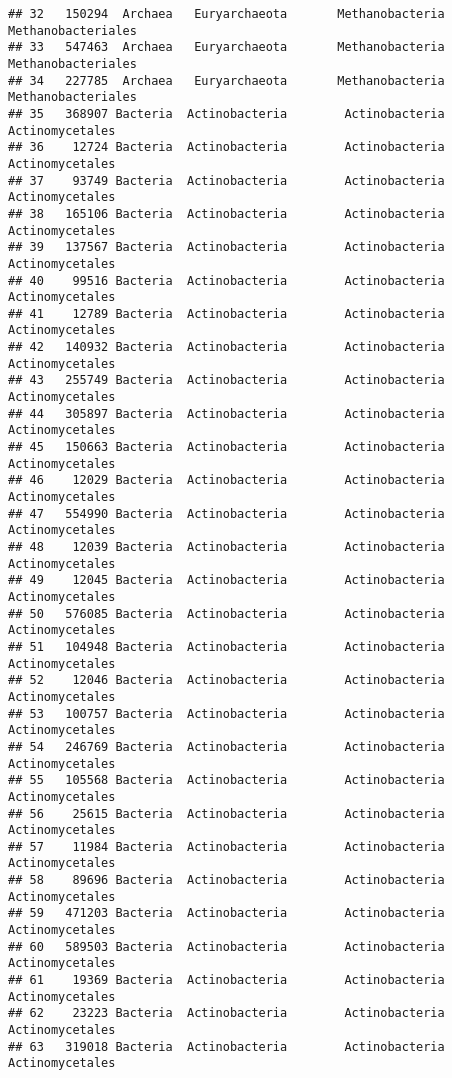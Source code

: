 \documentclass[
]{article}
\begin{document}
\begin{verbatim}
## 32   150294  Archaea   Euryarchaeota       Methanobacteria  Methanobacteriales
## 33   547463  Archaea   Euryarchaeota       Methanobacteria  Methanobacteriales
## 34   227785  Archaea   Euryarchaeota       Methanobacteria  Methanobacteriales
## 35   368907 Bacteria  Actinobacteria        Actinobacteria     Actinomycetales
## 36    12724 Bacteria  Actinobacteria        Actinobacteria     Actinomycetales
## 37    93749 Bacteria  Actinobacteria        Actinobacteria     Actinomycetales
## 38   165106 Bacteria  Actinobacteria        Actinobacteria     Actinomycetales
## 39   137567 Bacteria  Actinobacteria        Actinobacteria     Actinomycetales
## 40    99516 Bacteria  Actinobacteria        Actinobacteria     Actinomycetales
## 41    12789 Bacteria  Actinobacteria        Actinobacteria     Actinomycetales
## 42   140932 Bacteria  Actinobacteria        Actinobacteria     Actinomycetales
## 43   255749 Bacteria  Actinobacteria        Actinobacteria     Actinomycetales
## 44   305897 Bacteria  Actinobacteria        Actinobacteria     Actinomycetales
## 45   150663 Bacteria  Actinobacteria        Actinobacteria     Actinomycetales
## 46    12029 Bacteria  Actinobacteria        Actinobacteria     Actinomycetales
## 47   554990 Bacteria  Actinobacteria        Actinobacteria     Actinomycetales
## 48    12039 Bacteria  Actinobacteria        Actinobacteria     Actinomycetales
## 49    12045 Bacteria  Actinobacteria        Actinobacteria     Actinomycetales
## 50   576085 Bacteria  Actinobacteria        Actinobacteria     Actinomycetales
## 51   104948 Bacteria  Actinobacteria        Actinobacteria     Actinomycetales
## 52    12046 Bacteria  Actinobacteria        Actinobacteria     Actinomycetales
## 53   100757 Bacteria  Actinobacteria        Actinobacteria     Actinomycetales
## 54   246769 Bacteria  Actinobacteria        Actinobacteria     Actinomycetales
## 55   105568 Bacteria  Actinobacteria        Actinobacteria     Actinomycetales
## 56    25615 Bacteria  Actinobacteria        Actinobacteria     Actinomycetales
## 57    11984 Bacteria  Actinobacteria        Actinobacteria     Actinomycetales
## 58    89696 Bacteria  Actinobacteria        Actinobacteria     Actinomycetales
## 59   471203 Bacteria  Actinobacteria        Actinobacteria     Actinomycetales
## 60   589503 Bacteria  Actinobacteria        Actinobacteria     Actinomycetales
## 61    19369 Bacteria  Actinobacteria        Actinobacteria     Actinomycetales
## 62    23223 Bacteria  Actinobacteria        Actinobacteria     Actinomycetales
## 63   319018 Bacteria  Actinobacteria        Actinobacteria     Actinomycetales

\end{verbatim}
\end{document}
